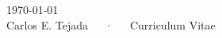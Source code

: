 \documentclass[11pt, a4paper]{awesome-cv}
\begin{document}
  \makecvheader
  \makecvfooter
    {\today\\}
    {Carlos E. Tejada~~~·~~~Curriculum Vitae}
    {\thepage}

  
  
  
  
  
  
  \ifdefined\WithReferences\fi
\end{document}
